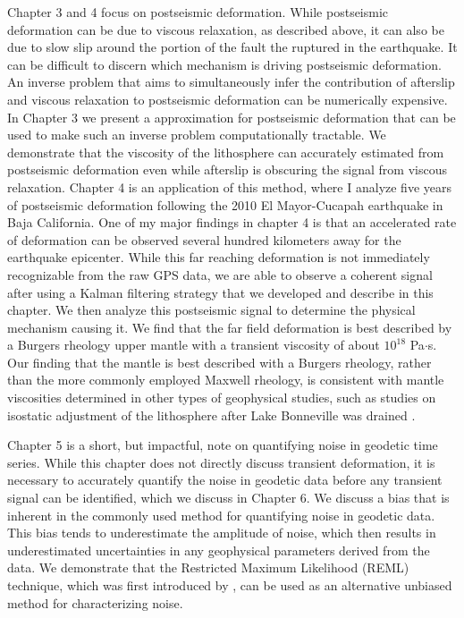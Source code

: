 Chapter 3 and 4 focus on postseismic deformation. While postseismic deformation can be due to viscous relaxation, as described above, it can also be due to slow slip around the portion of the fault the ruptured in the earthquake. It can be difficult to discern which mechanism is driving postseismic deformation. An inverse problem that aims to simultaneously infer the contribution of afterslip and viscous relaxation to postseismic deformation can be numerically expensive. In Chapter 3 we present a approximation for postseismic deformation that can be used to make such an inverse problem computationally tractable. We demonstrate that the viscosity of the lithosphere can accurately estimated from postseismic deformation even while afterslip is obscuring the signal from viscous relaxation. Chapter 4 is an application of this method, where I analyze five years of postseismic deformation following the 2010 El Mayor-Cucapah earthquake in Baja California. One of my major findings in chapter 4 is that an accelerated rate of deformation can be observed several hundred kilometers away for the earthquake epicenter. While this far reaching deformation is not immediately recognizable from the raw GPS data, we are able to observe a coherent signal after using a Kalman filtering strategy that we developed and describe in this chapter. We then analyze this postseismic signal to determine the physical mechanism causing it. We find that the far field deformation is best described by a Burgers rheology upper mantle with a transient viscosity of about $10^{18}$ Pa$\cdot$s. Our finding that the mantle is best described with a Burgers rheology, rather than the more commonly employed Maxwell rheology, is consistent with mantle viscosities determined in other types of geophysical studies, such as studies on isostatic adjustment of the lithosphere after Lake Bonneville was drained \citep{Crittenden1967,Bills1987}.    

Chapter 5 is a short, but impactful, note on quantifying noise in geodetic time series.  While this chapter does not directly discuss transient deformation, it is necessary to accurately quantify the noise in geodetic data before any transient signal can be identified, which we discuss in Chapter 6. We discuss a bias that is inherent in the commonly used method for quantifying noise in geodetic data. This bias tends to underestimate the amplitude of noise, which then results in underestimated uncertainties in any geophysical parameters derived from the data. We demonstrate that the Restricted Maximum Likelihood (REML) technique, which was first introduced by \citep{Patterson1971}, can be used as an alternative unbiased method for characterizing noise.

